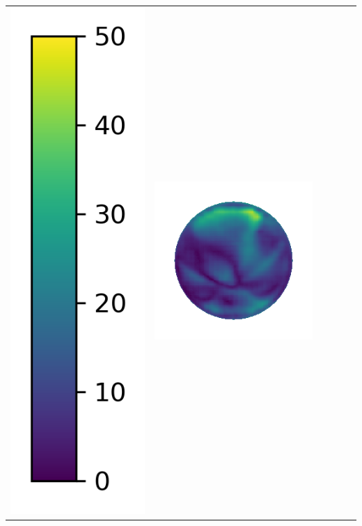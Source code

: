 \begin{tabularx}{\linewidth}{@{}Y@{}Y@{}Y@{}Y@{}Y@{}Y@{}}
\includegraphics[width=0.2\linewidth]{semisynthetic/colorbar_error_vertical.png} &
\includegraphics[width=\linewidth]{semisynthetic/20150514_13_ours_err.png} &

\end{tabularx}
